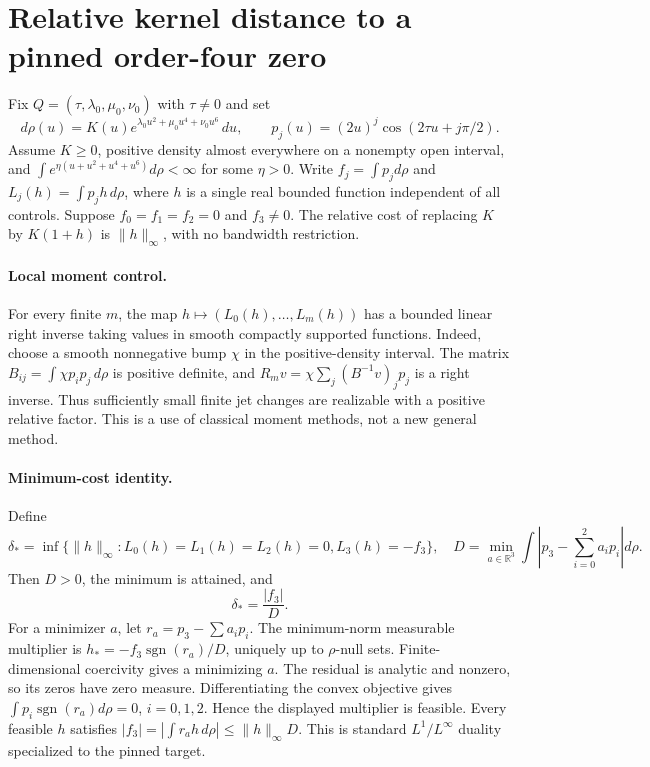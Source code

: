 \section{Relative kernel distance to a pinned order-four zero}

Fix $Q=(\tau,\lambda_0,\mu_0,\nu_0)$ with $\tau\ne0$ and set
\[
 d\rho(u)=K(u)e^{\lambda_0u^2+\mu_0u^4+\nu_0u^6}\,du,
 \qquad p_j(u)=(2u)^j\cos(2\tau u+j\pi/2).
\]
Assume $K\ge0$, positive density almost everywhere on a nonempty open
interval, and $\int e^{\eta(u+u^2+u^4+u^6)}d\rho<\infty$ for some
$\eta>0$. Write $f_j=\int p_jd\rho$ and $L_j(h)=\int p_jh\,d\rho$,
where $h$ is a single real bounded function independent of all controls.
Suppose $f_0=f_1=f_2=0$ and $f_3\ne0$. The relative cost of replacing
$K$ by $K(1+h)$ is $\|h\|_\infty$, with no bandwidth restriction.

\paragraph{Local moment control.}
For every finite $m$, the map $h\mapsto(L_0(h),\ldots,L_m(h))$ has a
bounded linear right inverse taking values in smooth compactly supported
functions. Indeed, choose a smooth nonnegative bump $\chi$ in the
positive-density interval. The matrix
$B_{ij}=\int\chi p_i p_j\,d\rho$ is positive definite, and
$R_mv=\chi\sum_j(B^{-1}v)_jp_j$ is a right inverse. Thus sufficiently
small finite jet changes are realizable with a positive relative factor.
This is a use of classical moment methods, not a new general method.

\paragraph{Minimum-cost identity.}
Define
\[
 \delta_* = \inf\{\|h\|_\infty:L_0(h)=L_1(h)=L_2(h)=0,
                                  L_3(h)=-f_3\},
 \quad
 D=\min_{a\in\mathbb R^3}\int\left|p_3-\sum_{i=0}^2a_ip_i\right|d\rho.
\]
Then $D>0$, the minimum is attained, and
\[
 \delta_* = \frac{|f_3|}{D}.
\]
For a minimizer $a$, let $r_a=p_3-\sum a_ip_i$.
The minimum-norm measurable multiplier is
$h_*=-f_3\operatorname{sgn}(r_a)/D$, uniquely up to $\rho$-null sets.
Finite-dimensional coercivity gives a minimizing $a$. The residual is
analytic and nonzero, so its zeros have zero measure. Differentiating
the convex objective gives $\int p_i\operatorname{sgn}(r_a)d\rho=0$,
$i=0,1,2$. Hence the displayed multiplier is feasible. Every feasible
$h$ satisfies $|f_3|=|\int r_ah\,d\rho|\le\|h\|_\infty D$.
This is standard $L^1/L^\infty$ duality specialized to the pinned target.

